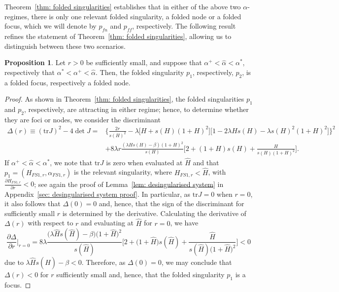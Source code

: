 \documentclass{article}
\theoremstyle{definition}
\numberwithin{equation}{section}
\newtheorem{prop}{Proposition}
\begin{document}
Theorem~\ref{thm: folded singularities} establishes that in either of the above two $\alpha$-regimes, there is only one relevant folded singularity, a folded node or a folded focus, which we will denote by $p_{fn}$ and $p_{ff}$, respectively. The following result refines the statement of Theorem~\ref{thm: folded singularities}, allowing us to distinguish between these two scenarios.
\begin{prop} Let $r>0$ be sufficiently small, and suppose that $\alpha^{+}<\hat\alpha<\alpha^\ast$, respectively that $\alpha^\ast<\alpha^+<\hat\alpha$. Then, the folded singularity $p_1$, respectively, $p_2$, is a folded focus, respectively a folded node.
\label{prop: folded node/focus}
\end{prop}
\begin{proof}
As shown in Theorem~\ref{thm: folded singularities}, the folded singularities $p_1$ and $p_2$, respectively, are attracting in either regime; hence, to determine whether they are foci or nodes, we consider the discriminant
\begin{equation} 
\begin{split}
    \Delta(r)\equiv(\mathrm{tr}J)^2-4\det J =& \bigg\{\frac{2r}{s(H)^2}-\lambda\big[H+s(H)(1+H)^2\big]\big[1-2\lambda H s(H)-\lambda s(H)^2(1+H)^2\big]\bigg\}^2 \\
    &+8\lambda r \frac{(\lambda Hs(H)-\beta)(1+H)^2}{s(H)}\bigg[2+(1+H)s(H)+\frac{H}{s(H)(1+H)^2}\bigg].
    \label{eq: Discriminant}
\end{split}
\end{equation}
If $\alpha^{+}<\hat\alpha<\alpha^\ast$, we note that $\mathrm{tr}J$ is zero when evaluated at $\hat{H}$ and that $p_1=(H_{FS1,r},\alpha_{FS1,r})$ is the relevant singularity, where $H_{FS1,r}<\hat{H}$, with $\frac{\partial H_{FS1,r}}{\partial r}<0$; see again the proof of Lemma~\ref{lem: desingularised system} in Appendix~\ref{sec: desingularised system proof}. In particular, as $\mathrm{tr}J=0$ when $r=0$, it also follows that $\Delta(0)=0$ and, hence, that the sign of the discriminant for sufficiently small $r$ is determined by the derivative. Calculating the derivative of $\Delta(r)$ with respect to $r$ and evaluating at $\hat{H}$ for $r=0$, we have
\begin{equation}
    \frac{\partial \Delta}{\partial r}\Big\rvert_{r=0}=8\lambda \frac{\big(\lambda \hat{H}s(\hat{H})-\beta\big)\big(1+\hat{H}\big)^2}{s(\hat{H})}\Bigg[2+\big(1+\hat{H}\big)s(\hat{H})+\frac{\hat{H}}{s(\hat{H})\big(1+\hat{H}\big)^2}\Bigg]<0
    \label{eq: deriv discriminant}
\end{equation}
due to $\lambda \hat{H}s(\hat{H})-\beta<0$.
Therefore, as $\Delta(0)=0$, we may conclude that $\Delta(r)<0$ for $r$ sufficiently small and, hence, that the folded singularity $p_1$ is a focus.


\end{proof}
\end{document}
